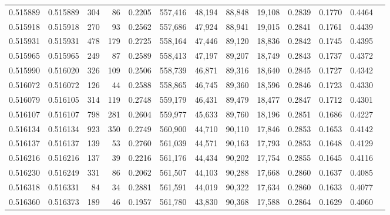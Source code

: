 \begin{tabular}{rrrrrrrrrrrrr}
0.515889 & 0.515889 &   304 &    86 &                                     0.2205 & 557,416 &  48,194 &  88,848 &  19,108 & 0.2839 & 0.1770 & 0.4464 \\
0.515918 & 0.515918 &   270 &    93 &                                     0.2562 & 557,686 &  47,924 &  88,941 &  19,015 & 0.2841 & 0.1761 & 0.4439 \\
0.515931 & 0.515931 &   478 &   179 &                                     0.2725 & 558,164 &  47,446 &  89,120 &  18,836 & 0.2842 & 0.1745 & 0.4395 \\
0.515965 & 0.515965 &   249 &    87 &                                     0.2589 & 558,413 &  47,197 &  89,207 &  18,749 & 0.2843 & 0.1737 & 0.4372 \\
0.515990 & 0.516020 &   326 &   109 &                                     0.2506 & 558,739 &  46,871 &  89,316 &  18,640 & 0.2845 & 0.1727 & 0.4342 \\
0.516072 & 0.516072 &   126 &    44 &                                     0.2588 & 558,865 &  46,745 &  89,360 &  18,596 & 0.2846 & 0.1723 & 0.4330 \\
0.516079 & 0.516105 &   314 &   119 &                                     0.2748 & 559,179 &  46,431 &  89,479 &  18,477 & 0.2847 & 0.1712 & 0.4301 \\
0.516107 & 0.516107 &   798 &   281 &                                     0.2604 & 559,977 &  45,633 &  89,760 &  18,196 & 0.2851 & 0.1686 & 0.4227 \\
0.516134 & 0.516134 &   923 &   350 &                                     0.2749 & 560,900 &  44,710 &  90,110 &  17,846 & 0.2853 & 0.1653 & 0.4142 \\
0.516137 & 0.516137 &   139 &    53 &                                     0.2760 & 561,039 &  44,571 &  90,163 &  17,793 & 0.2853 & 0.1648 & 0.4129 \\
0.516216 & 0.516216 &   137 &    39 &                                     0.2216 & 561,176 &  44,434 &  90,202 &  17,754 & 0.2855 & 0.1645 & 0.4116 \\
0.516230 & 0.516249 &   331 &    86 &                                     0.2062 & 561,507 &  44,103 &  90,288 &  17,668 & 0.2860 & 0.1637 & 0.4085 \\
0.516318 & 0.516331 &    84 &    34 &                                     0.2881 & 561,591 &  44,019 &  90,322 &  17,634 & 0.2860 & 0.1633 & 0.4077 \\
0.516360 & 0.516373 &   189 &    46 &                                     0.1957 & 561,780 &  43,830 &  90,368 &  17,588 & 0.2864 & 0.1629 & 0.4060 \\

\end{tabular}
